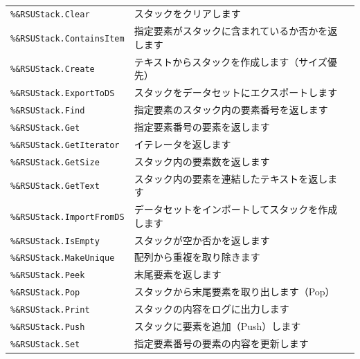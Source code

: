 \paragraph{\DocStrTitleRDMPackageFunctionList}
\begin{center}
{\footnotesize
\begin{xltabular}{\textwidth}{|p{4truecm}|X|p{1.2truecm}|}
\hline
\thead{\DocStrHeaderFunctionName}&\thead{\DocStrDescription}&\thead{\DocStrRefto}\\
\hline
\hline
\texttt{\%\&RSUStack.Clear}&スタックをクリアします&\\
\hline
\texttt{\%\&RSUStack.ContainsItem}&指定要素がスタックに含まれているか否かを返します&\\
\hline
\texttt{\%\&RSUStack.Create}&テキストからスタックを作成します（サイズ優先）&\\
\hline
\texttt{\%\&RSUStack.ExportToDS}&スタックをデータセットにエクスポートします&\\
\hline
\texttt{\%\&RSUStack.Find}&指定要素のスタック内の要素番号を返します&\\
\hline
\texttt{\%\&RSUStack.Get}&指定要素番号の要素を返します&\\
\hline
\texttt{\%\&RSUStack.GetIterator}&イテレータを返します&\\
\hline
\texttt{\%\&RSUStack.GetSize}&スタック内の要素数を返します&\\
\hline
\texttt{\%\&RSUStack.GetText}&スタック内の要素を連結したテキストを返します&\\
\hline
\texttt{\%\&RSUStack.ImportFromDS}&データセットをインポートしてスタックを作成します&\\
\hline
\texttt{\%\&RSUStack.IsEmpty}&スタックが空か否かを返します&\\
\hline
\texttt{\%\&RSUStack.MakeUnique}&配列から重複を取り除きます&\\
\hline
\texttt{\%\&RSUStack.Peek}&末尾要素を返します&\\
\hline
\texttt{\%\&RSUStack.Pop}&スタックから末尾要素を取り出します（Pop）&\\
\hline
\texttt{\%\&RSUStack.Print}&スタックの内容をログに出力します&\\
\hline
\texttt{\%\&RSUStack.Push}&スタックに要素を追加（Push）します&\\
\hline
\texttt{\%\&RSUStack.Set}&指定要素番号の要素の内容を更新します&\\
\hline
\end{xltabular}
}
\end{center}
